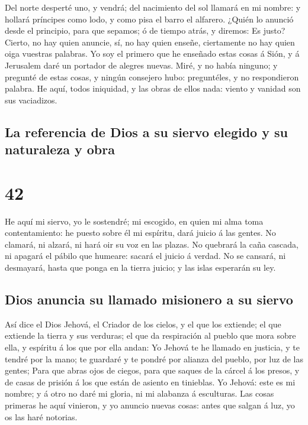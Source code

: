  Del norte desperté uno, y vendrá; del nacimiento del sol
llamará en mi nombre: y hollará príncipes como lodo, y como pisa el
barro el alfarero.  ¿Quién lo anunció desde el principio,
para que sepamos; ó de tiempo atrás, y diremos: Es justo? Cierto, no hay
quien anuncie, sí, no hay quien enseñe, ciertamente no hay quien oiga
vuestras palabras.  Yo soy el primero que he enseñado
estas cosas á Sión, y á Jerusalem daré un portador de alegres nuevas.
 Miré, y no había ninguno; y pregunté de estas cosas, y
ningún consejero hubo: preguntéles, y no respondieron palabra.
 He aquí, todos iniquidad, y las obras de ellos nada:
viento y vanidad son sus vaciadizos.

\hypertarget{la-referencia-de-dios-a-su-siervo-elegido-y-su-naturaleza-y-obra}{%
\subsection{La referencia de Dios a su siervo elegido y su naturaleza y
obra}\label{la-referencia-de-dios-a-su-siervo-elegido-y-su-naturaleza-y-obra}}

\hypertarget{section-23-42}{%
\section{42}\label{section-23-42}}

 He aquí mi siervo, yo le sostendré; mi escogido, en quien
mi alma toma contentamiento: he puesto sobre él mi espíritu, dará juicio
á las gentes.  No clamará, ni alzará, ni hará oir su voz
en las plazas.  No quebrará la caña cascada, ni apagará el
pábilo que humeare: sacará el juicio á verdad.  No se
cansará, ni desmayará, hasta que ponga en la tierra juicio; y las islas
esperarán su ley.

\hypertarget{dios-anuncia-su-llamado-misionero-a-su-siervo}{%
\subsection{Dios anuncia su llamado misionero a su
siervo}\label{dios-anuncia-su-llamado-misionero-a-su-siervo}}

 Así dice el Dios Jehová, el Criador de los cielos, y el
que los extiende; el que extiende la tierra y sus verduras; el que da
respiración al pueblo que mora sobre ella, y espíritu á los que por ella
andan:  Yo Jehová te he llamado en justicia, y te tendré
por la mano; te guardaré y te pondré por alianza del pueblo, por luz de
las gentes;  Para que abras ojos de ciegos, para que
saques de la cárcel á los presos, y de casas de prisión á los que están
de asiento en tinieblas.  Yo Jehová: este es mi nombre; y
á otro no daré mi gloria, ni mi alabanza á esculturas. 
Las cosas primeras he aquí vinieron, y yo anuncio nuevas cosas: antes
que salgan á luz, yo os las haré notorias.

